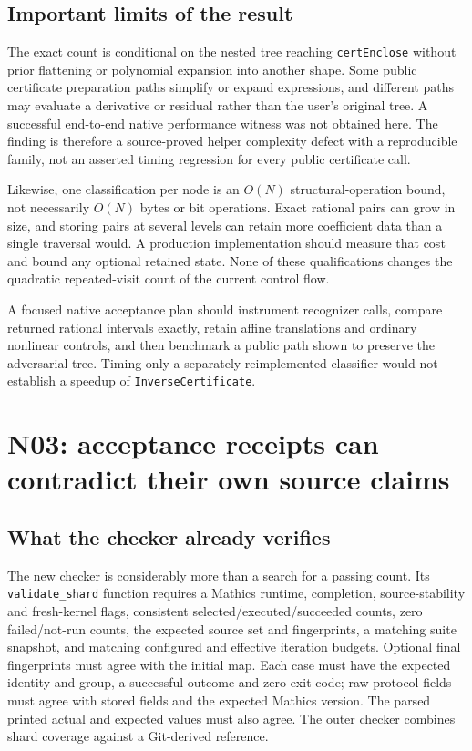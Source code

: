 \documentclass[11pt,letterpaper]{article}
\newcommand{\prop}[1]{\texttt{#1}}
\begin{document}
\subsection{Important limits of the result}

The exact count is conditional on the nested tree reaching \prop{certEnclose}
without prior flattening or polynomial expansion into another shape. Some public
certificate preparation paths simplify or expand expressions, and different
paths may evaluate a derivative or residual rather than the user's original tree.
A successful end-to-end native performance witness was not obtained here. The
finding is therefore a source-proved helper complexity defect with a reproducible
family, not an asserted timing regression for every public certificate call.

Likewise, one classification per node is an $O(N)$ structural-operation bound,
not necessarily $O(N)$ bytes or bit operations. Exact rational pairs can grow in
size, and storing pairs at several levels can retain more coefficient data than a
single traversal would. A production implementation should measure that cost and
bound any optional retained state. None of these qualifications changes the
quadratic repeated-visit count of the current control flow.

A focused native acceptance plan should instrument recognizer calls, compare
returned rational intervals exactly, retain affine translations and ordinary
nonlinear controls, and then benchmark a public path shown to preserve the
adversarial tree. Timing only a separately reimplemented classifier would not
establish a speedup of \prop{InverseCertificate}.

\section{N03: acceptance receipts can contradict their own source claims}
\label{sec:n03}

\subsection{What the checker already verifies}

The new checker is considerably more than a search for a passing count. Its
\prop{validate\_shard} function requires a Mathics runtime, completion,
source-stability and fresh-kernel flags, consistent selected/executed/succeeded
counts, zero failed/not-run counts, the expected source set and fingerprints,
a matching suite snapshot, and matching configured and effective iteration
budgets. Optional final fingerprints must agree with the initial map. Each case
must have the expected identity and group, a successful outcome and zero exit
code; raw protocol fields must agree with stored fields and the expected Mathics
version. The parsed printed actual and expected values must also agree. The
outer checker combines shard coverage against a Git-derived reference.\cite{checker}
\end{document}
